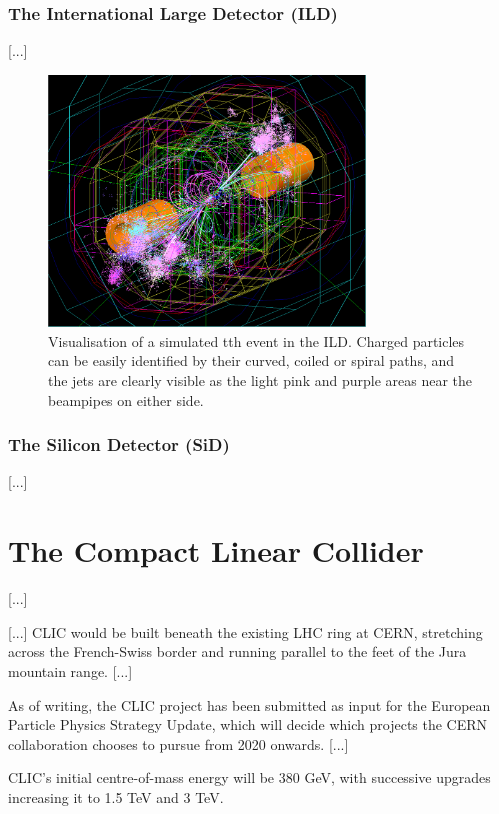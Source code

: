\subsubsection{The International Large Detector (ILD)}
[...]

\begin{figure}[h]
	\centering
	\includegraphics[width=0.75\textwidth]{../Pictures/SimulatedEvent1.png}
	\caption{Visualisation of a simulated tth event in the ILD. Charged particles can be easily identified by their curved, coiled or spiral paths, and the jets are clearly visible as the light pink and purple areas near the beampipes on either side.}
	\label{figure:colliders/ILD/tth-simulation}
\end{figure}

\subsubsection{The Silicon Detector (SiD)}
[...]

\section{The Compact Linear Collider}
[...]

[...] CLIC would be built beneath the existing LHC ring at CERN, stretching across the French-Swiss border and running parallel to the feet of the Jura mountain range. [...]

As of writing, the CLIC project has been submitted as input for the European Particle Physics Strategy Update, which will decide which projects the CERN collaboration chooses to pursue from 2020  onwards. [...]

CLIC's initial centre-of-mass energy will be 380 GeV, with successive upgrades increasing it to 1.5 TeV and 3 TeV. 